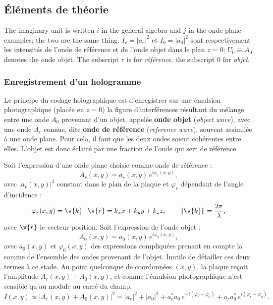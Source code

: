 \subsection{Éléments de théorie}

\begin{notation}
  The imaginary unit is written $i$ in the general algebra and $j$ in the onde
  plane examples; the two are the same thing. $I_r = |a_r|^2$ et
  $I_0 = |a_0|^2$ sont respectivement les intensités de l'onde de référence et
  de l'onde objet dans le plan $z=0$; $U_0 \equiv A_0$ denotes the onde objet.
  The subscript $r$ is for \textit{référence}, the subscript $0$ for
  \textit{objet}.
\end{notation}

\subsubsection{Enregistrement d'un hologramme}
Le principe du codage holographique est d'enregistrer sur une émulsion
photographique (placée en $z=0$) la figure d'interférences résultant du mélange
entre une onde $A_0$ provenant d'un objet, appelée \textbf{onde objet}
(\textit{object wave}), avec une onde $A_r$ connue, dite \textbf{onde de
référence} (\textit{reference wave}), souvent assimilée à une onde plane. Pour
cela, il faut que les deux ondes soient cohérentes entre elles. L'objet est donc
éclairé par une fraction de l'onde qui sert de référence.

Soit l'expression d'une onde plane choisie comme onde de référence :
\begin{equation*}
  A_r(x,y) = a_r(x,y)\,e^{i\varphi_r(x,y)},
\end{equation*}
avec $|a_r(x,y)|^2$ constant dans le plan de la plaque et $\varphi_r$ dépendant
de l'angle d'incidence :
\begin{equation*}
  \varphi_r(x,y) = \v{k}\cdot\v{r} = k_x x + k_y y + k_z z,
  \qquad \|\v{k}\| = \frac{2\pi}{\lambda},
\end{equation*}
avec $\v{r}$ le vecteur position. Soit l'expression de l'onde objet :
\begin{equation*}
  A_0(x,y) = a_0(x,y)\,e^{i\varphi_0(x,y)},
\end{equation*}
avec $a_0(x,y)$ et $\varphi_0(x,y)$ des expressions compliquées prenant en compte
la somme de l'ensemble des ondes provenant de l'objet. Inutile de détailler ces
deux termes à ce stade. Au point quelconque de coordonnées $(x,y)$, la plaque
reçoit l'amplitude $A_r(x,y)+A_0(x,y)$, et comme l'émulsion photographique n'est
sensible qu'au module au carré du champ,
\begin{equation*}
  I(x,y) \propto |A_r(x,y)+A_0(x,y)|^2
  = |a_r|^2 + |a_0|^2 + a_r^{*}a_0\,e^{-i(\varphi_r-\varphi_0)}
  + a_r a_0^{*}\,e^{i(\varphi_r-\varphi_0)}.
\end{equation*}

